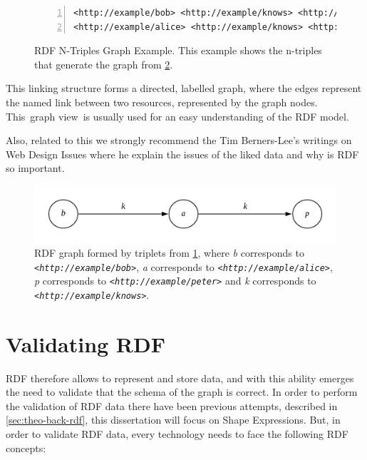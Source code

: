 \begin{figure}
\begin{lstlisting}[numbers=left, basicstyle=\ttfamily\scriptsize]
<http://example/bob> <http://example/knows> <http://example/alice> .
<http://example/alice> <http://example/knows> <http://example/peter> .
\end{lstlisting}
\caption[RDF N-Triples Graph Example]{RDF N-Triples Graph Example. This example shows the n-triples
that generate the graph from \cref{fig:rdf-graph}.}
\label{fig:rdf-ntriples-graph}
\end{figure}

This linking structure forms a directed, labelled graph, where the edges represent the named link
between two resources, represented by the graph nodes. This graph view is usually used for an easy understanding of the RDF model.

Also, related to this we strongly recommend the Tim Berners-Lee’s writings on Web Design Issues
\cite{semantic-roadmap} where he explain the issues of the liked data and why is RDF so important.

\begin{figure}
\includegraphics[scale=0.2]{images/shex-lite-rdf-graph.png}
\centering
\caption[RDF Example graph]{RDF graph formed by triplets from \cref{fig:rdf-ntriples-graph}, where
\textit{b} corresponds to \textit{\texttt{<http://example/bob>}}, \textit{a} corresponds to
\textit{\texttt{<http://example/alice>}}, \textit{p} corresponds to \textit{\texttt{<http://example/peter>}}
and \textit{k} corresponds to \textit{\texttt{<http://example/knows>}}.}
\label{fig:rdf-graph}
\end{figure}


\section{Validating RDF}
RDF therefore allows to represent and store data, and with this ability emerges the need to validate
that the schema of the graph is correct. In order to perform the validation of RDF data there have
been previous attempts, described in \cref{sec:theo-back-rdf}, this dissertation will focus
on Shape Expressions. But, in order to validate RDF data, every technology needs to face the following
RDF concepts:


